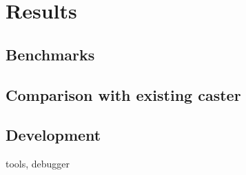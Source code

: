 \section{Results}


\subsection{Benchmarks}

\subsection{Comparison with existing caster}

\subsection{Development}

tools, debugger